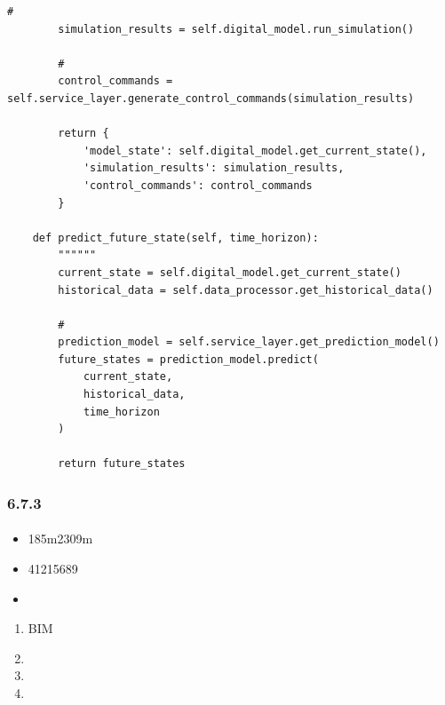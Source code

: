 \begin{lstlisting}[style=python]
        # 
        simulation_results = self.digital_model.run_simulation()
        
        # 
        control_commands = self.service_layer.generate_control_commands(simulation_results)
        
        return {
            'model_state': self.digital_model.get_current_state(),
            'simulation_results': simulation_results,
            'control_commands': control_commands
        }
        
    def predict_future_state(self, time_horizon):
        """"""
        current_state = self.digital_model.get_current_state()
        historical_data = self.data_processor.get_historical_data()
        
        # 
        prediction_model = self.service_layer.get_prediction_model()
        future_states = prediction_model.predict(
            current_state, 
            historical_data, 
            time_horizon
        )
        
        return future_states
\end{lstlisting}

\hypertarget{section-133}{%
\subsubsection{6.7.3}\label{section-133}}

\hypertarget{section-134}{%
\paragraph{}\label{section-134}}

\important{}

\begin{itemize}
\item
  185m2309m
\item
  41215689
\item
  \important{}
\end{itemize}

\begin{enumerate}
\def\labelenumi{\arabic{enumi}.}
\item
  \important{}BIM
\item
  \important{}
\item
  \important{}
\item
  \important{}
\end{enumerate}

\important{}

